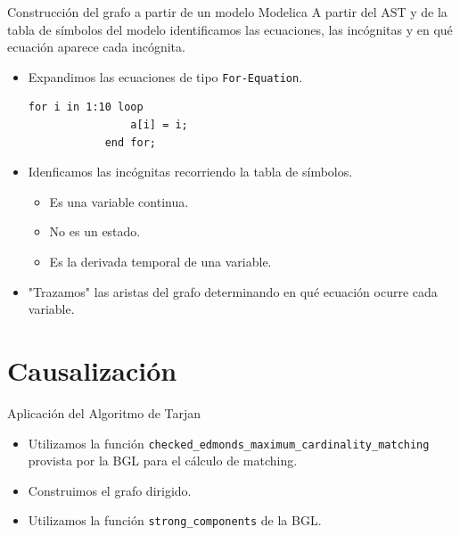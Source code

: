 \begin{frame}[fragile]{Construcción del grafo a partir de un modelo Modelica}
    A partir del AST y de la tabla de símbolos  del modelo identificamos las ecuaciones, las incógnitas y en qué ecuación aparece cada incógnita.
    \pause
    \begin{itemize}
        \item<2-> Expandimos las ecuaciones de tipo \verb+For-Equation+.
        \begin{lstlisting}[language=Modelica]
            for i in 1:10 loop
                a[i] = i;
            end for;
        \end{lstlisting}
        \item<3-> Idenficamos las incógnitas recorriendo la tabla de símbolos.
        \begin{itemize}
            \item Es una variable continua.
            \item No es un estado.
            \item Es la derivada temporal de una variable.
        \end{itemize}
        \item<4-> "Trazamos" las aristas del grafo determinando en qué ecuación ocurre cada variable.
    \end{itemize}
\end{frame}

\section{Causalización}

\begin{frame}[fragile]{Aplicación del Algoritmo de Tarjan}
    \begin{itemize}
        \item<1-> Utilizamos la función \verb+checked_edmonds_maximum_cardinality_matching+ provista por la BGL para el cálculo de matching.
        \item<2-> Construimos el grafo dirigido.
        \item<3-> Utilizamos la función \verb+strong_components+ de la BGL.
    \end{itemize}
\end{frame}

